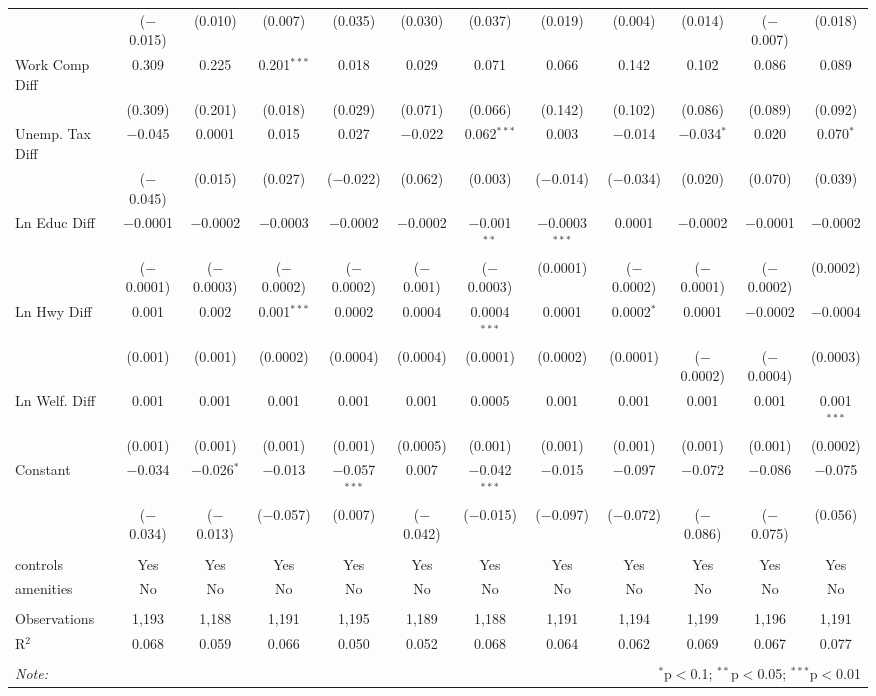 \begin{table}[!htbp]
\begin{tabular}{@{\extracolsep{5pt}}lccccccccccc}
  & ($-$0.015) & (0.010) & (0.007) & (0.035) & (0.030) & (0.037) & (0.019) & (0.004) & (0.014) & ($-$0.007) & (0.018) \\ 
  Work Comp Diff & 0.309 & 0.225 & 0.201$^{***}$ & 0.018 & 0.029 & 0.071 & 0.066 & 0.142 & 0.102 & 0.086 & 0.089 \\ 
  & (0.309) & (0.201) & (0.018) & (0.029) & (0.071) & (0.066) & (0.142) & (0.102) & (0.086) & (0.089) & (0.092) \\ 
  Unemp. Tax Diff & $-$0.045 & 0.0001 & 0.015 & 0.027 & $-$0.022 & 0.062$^{***}$ & 0.003 & $-$0.014 & $-$0.034$^{*}$ & 0.020 & 0.070$^{*}$ \\ 
  & ($-$0.045) & (0.015) & (0.027) & ($-$0.022) & (0.062) & (0.003) & ($-$0.014) & ($-$0.034) & (0.020) & (0.070) & (0.039) \\ 
  Ln Educ Diff & $-$0.0001 & $-$0.0002 & $-$0.0003 & $-$0.0002 & $-$0.0002 & $-$0.001$^{**}$ & $-$0.0003$^{***}$ & 0.0001 & $-$0.0002 & $-$0.0001 & $-$0.0002 \\ 
  & ($-$0.0001) & ($-$0.0003) & ($-$0.0002) & ($-$0.0002) & ($-$0.001) & ($-$0.0003) & (0.0001) & ($-$0.0002) & ($-$0.0001) & ($-$0.0002) & (0.0002) \\ 
  Ln Hwy Diff & 0.001 & 0.002 & 0.001$^{***}$ & 0.0002 & 0.0004 & 0.0004$^{***}$ & 0.0001 & 0.0002$^{*}$ & 0.0001 & $-$0.0002 & $-$0.0004 \\ 
  & (0.001) & (0.001) & (0.0002) & (0.0004) & (0.0004) & (0.0001) & (0.0002) & (0.0001) & ($-$0.0002) & ($-$0.0004) & (0.0003) \\ 
  Ln Welf. Diff & 0.001 & 0.001 & 0.001 & 0.001 & 0.001 & 0.0005 & 0.001 & 0.001 & 0.001 & 0.001 & 0.001$^{***}$ \\ 
  & (0.001) & (0.001) & (0.001) & (0.001) & (0.0005) & (0.001) & (0.001) & (0.001) & (0.001) & (0.001) & (0.0002) \\ 
  Constant & $-$0.034 & $-$0.026$^{*}$ & $-$0.013 & $-$0.057$^{***}$ & 0.007 & $-$0.042$^{***}$ & $-$0.015 & $-$0.097 & $-$0.072 & $-$0.086 & $-$0.075 \\ 
  & ($-$0.034) & ($-$0.013) & ($-$0.057) & (0.007) & ($-$0.042) & ($-$0.015) & ($-$0.097) & ($-$0.072) & ($-$0.086) & ($-$0.075) & (0.056) \\ 
 \hline \\[-1.8ex] 
controls & Yes & Yes & Yes & Yes & Yes & Yes & Yes & Yes & Yes & Yes & Yes \\ 
amenities & No & No & No & No & No & No & No & No & No & No & No \\ 
\hline \\[-1.8ex] 
Observations & 1,193 & 1,188 & 1,191 & 1,195 & 1,189 & 1,188 & 1,191 & 1,194 & 1,199 & 1,196 & 1,191 \\ 
R$^{2}$ & 0.068 & 0.059 & 0.066 & 0.050 & 0.052 & 0.068 & 0.064 & 0.062 & 0.069 & 0.067 & 0.077 \\ 
\hline 
\hline \\[-1.8ex] 
\textit{Note:}  & \multicolumn{11}{r}{$^{*}$p$<$0.1; $^{**}$p$<$0.05; $^{***}$p$<$0.01} \\ 
\end{tabular} 
\end{table} 
